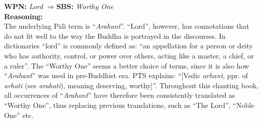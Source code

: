 \documentclass{article}
\newcommand{\change}[3]{
    \begin{tcolorbox}[colback=gray!10, colframe=gray!80, title=Dedication of Offerings]
        \textbf{WPN:} \textit{#1} \quad\(\Rightarrow\)\quad \textbf{SBS:} \textit{#2} \\
        \textbf{Reasoning:} \\
        #3
    \end{tcolorbox}
}
\begin{document}
\change{Lord}
       {Worthy One}
       {The underlying Pāli term is ``\textit{Arahant}''. ``Lord'', however, has connotations that do not fit well to the way the Buddha is portrayed in the discourses. In dictionaries ``lord'' is commonly defined as: ``an appellation for a person or deity who has authority, control, or power over others, acting like a master, a chief, or a ruler''. The ``Worthy One'' seems a better choice of terms, since it is also how ``\textit{Arahant}'' was used in pre-Buddhist era. PTS explains: ``[Vedic \textit{arhant}, ppr. of \textit{arhati} (see \textit{arahati}), meaning deserving, worthy]''. Throughout this chanting book, all occurrences of ``\textit{Arahant}'' have therefore been consistently translated as ``Worthy One'', thus replacing previous translations, such as ``The Lord'', ``Noble One'' etc.}
\end{document}
